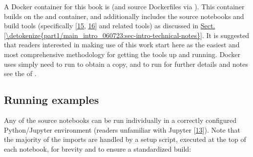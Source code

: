 \documentclass[letterpaper,table,10pt,english]{jupyterBook}
\begin{document}
\sphinxAtStartPar
A Docker container for this book is  (and source Dockerfiles via ). This container builds on the  and  container, and additionally includes the source notebooks and build tools (specifically  {[}\hyperlink{cite.backmatter/bibliography:id712}{15}, \hyperlink{cite.backmatter/bibliography:id566}{16}{]} and related tools) as discussed in  \hyperref[\detokenize{part1/main_intro_060723:sec-intro-technical-notes}]{Sect.\@ \ref{\detokenize{part1/main_intro_060723:sec-intro-technical-notes}}}. It is suggested that readers interested in making use of this work start here as the easiest \sphinxhyphen{} and most comprehensive \sphinxhyphen{} methodology for getting the tools up and running. Docker uses simply need to run  to obtain a copy, and  to run \sphinxhyphen{} for further details and notes see the  of .


\subsection{Running examples}
\label{\detokenize{part1/platform_intro_070723:running-examples}}
\sphinxAtStartPar
Any of the source notebooks can be run individually in a correctly configured Python/Jupyter environment (readers unfamiliar with Jupyter  {[}\hyperlink{cite.backmatter/bibliography:id829}{13}{]}). Note that the majority of the imports are handled by a setup script, executed at the top of each notebook, for brevity and to ensure a standardized build:

\begin{sphinxVerbatim}[commandchars=\\\{\}]
 
\end{sphinxVerbatim}
\end{document}
